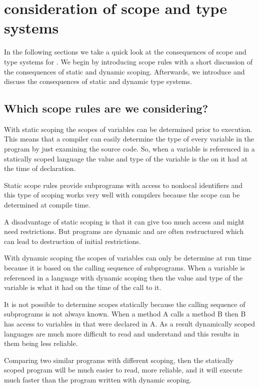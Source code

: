 \section{consideration of scope and type systems}

In the following sections we take a quick look at the consequences of scope and
type systems for \productname{}. We begin by introducing scope rules with a
short discussion of the consequences of static and dynamic scoping. Afterwards,
we introduce and discuss the consequences of static and dynamic type systems.

\subsection{Which scope rules are we considering?}

With static scoping the scopes of variables can be determined prior to
execution. This means that a compiler can easily determine the type of every
variable in the program by just examining the source code. So, when a variable
is referenced in a statically scoped language the value and type of the variable 
is the on it had at the time of declaration.


Static scope rules provide subprograms with access to nonlocal identifiers and
this type of scoping works very well with compilers because the scope can be
determined at compile time.

A disadvantage of static scoping is that it can give too much access and might
need restrictions. But programs are dynamic and are often restructured which
can lead to destruction of initial restrictions.

With dynamic scoping the scopes of variables can only be determine at run time
because it is based on the calling sequence of subprograms. When a variable is
referenced in a language with dynamic scoping then the value and type of the 
variable is what it had on the time of the call to it.
\cite[p. 227]{sebesta2013}

It is not possible to determine scopes statically because the calling sequence
of subprograms is not always known. When a method A calls a method B then B has 
access to variables in that were declared in A. As a result dynamically scoped
languages are much more difficult to read and understand and this results in
them being less reliable.


Comparing two similar programs with different scoping, then the statically
scoped program will be much easier to read, more reliable, and it will execute
much faster than the program written with dynamic scoping.
\cite[p. 229]{sebesta2013}


